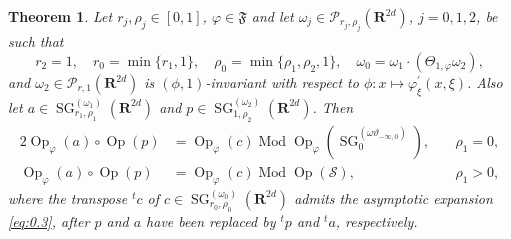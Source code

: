 \documentclass[12pt,a4paper,reqno]{amsart}
\numberwithin{equation}{section}
\newtheorem{thm}{Theorem}
\numberwithin{thm}{section}
\theoremstyle{definition}
\theoremstyle{remark}
\begin{document}
\begin{thm}
\label{thm:3.1}
Let $r_j,\rho _j\in [0,1]$, $\varphi \in {\mathfrak{F}}$ and let $\omega _j
\in {\mathscr P}_{r_j,\rho _j}({\mathbf R^{{2d}}})$, $j=0,1,2$, be such
that
$$
r_2=1,
\quad r_0=\min\{r_1,1\} ,\quad \rho _0=\min\{ \rho_1,\rho _2,1\},
\quad \omega _0 =\omega_1\cdot (\Theta _{1,{\varphi}} \omega _2),
$$
and $\omega _2\in \mathscr{P}_{r,1}({\mathbf R^{{2d}}})$ is
$(\phi,1)$-invariant with respect to $\phi \colon
x \mapsto \varphi^\prime_\xi (x,\xi)$.
Also let $a \in {\operatorname{SG}}^{(\omega _1)} _{r_1,\rho _1}({\mathbf R^{{2d}}})$ and
$p \in {\operatorname{SG}}^{(\omega _2)}_{1,\rho _2}({\mathbf R^{{2d}}})$.
Then
\begin{alignat*}{2}
{\operatorname{Op}} _\varphi(a) \circ {\operatorname{Op}} (p) &= {\operatorname{Op}}_{\varphi}(c) \operatorname{Mod}
{\operatorname{Op}} _\varphi ({\operatorname{SG}} ^{(\omega \vartheta _{-\infty ,0})}_0 ),& \quad \rho _1=0,
\\[1ex]
{\operatorname{Op}}_\varphi(a) \circ {\operatorname{Op}} (p) &= {\operatorname{Op}}_{\varphi}(c) \operatorname{Mod}
{\operatorname{Op}} (\mathscr S ),& \quad \rho _1>0,
\end{alignat*}
where the transpose ${^t}c$ of $c \in {\operatorname{SG}}^{(\omega _0)}
_{r_0,\rho _0}({\mathbf R^{{2d}}})$ admits the asymptotic expansion
\eqref{eq:0.3}, after $p$ and $a$ have been replaced by
${^t}p$ and ${^t}a$, respectively.
\end{thm}

\par
\end{document}

